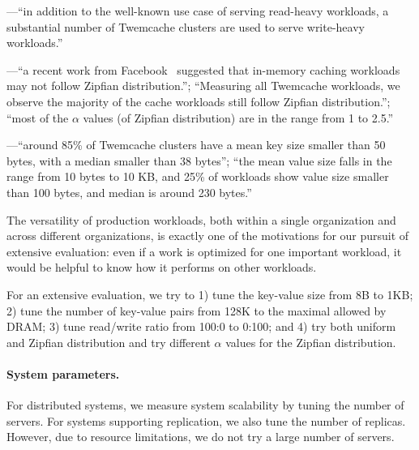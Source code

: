 \vspace{.05in}
\noindent
---``in addition to the well-known use case of serving read-heavy workloads, a substantial
number of Twemcache clusters are used to serve write-heavy workloads.''

\vspace{.05in}
\noindent
---``a recent work from Facebook~\cite{Berg2020CacheLib} suggested that in-memory caching workloads
may not follow Zipfian distribution.''; ``Measuring all Twemcache workloads, we observe the majority
of the cache workloads still follow Zipfian distribution.''; ``most of the $\alpha$ values (of Zipfian distribution) are in the range
from 1 to 2.5.''

\vspace{.05in}
\noindent
---``around 85\% of Twemcache clusters have a mean key size smaller than 50 bytes, with
a median smaller than 38 bytes''; ``the mean value size falls in the range from 10 bytes to 10 KB, and
25\% of workloads show value size smaller than 100 bytes,
and median is around 230 bytes.''

The versatility of production workloads, both within a single organization
and across different organizations, is exactly one of the motivations for our pursuit of extensive
evaluation: even if a work is optimized for one important workload, it would
be helpful to know how it performs on other workloads.

For an extensive evaluation, we try to 1) tune the key-value size from 8B to 1KB;
2) tune the number of key-value pairs from 128K to the maximal allowed by DRAM;
3) tune read/write ratio from 100:0 to 0:100; and 4) try both uniform and
Zipfian distribution and try different $\alpha$ values for the Zipfian distribution.

\vspace{-.1in}
\paragraph{System parameters.} For distributed systems, we measure
system scalability by tuning the number of servers. For systems supporting
replication, we also tune the number of replicas. However, due to resource
limitations, we do not try a large number of servers.


